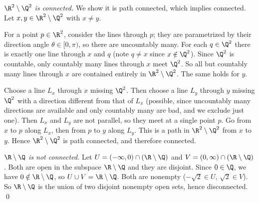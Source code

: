 
\emph{$\R^2\setminus\Q^2$ is connected.} We show it is path connected, which implies connected.
Let $x,y\in\R^2\setminus\Q^2$ with $x\neq y$.

For a point $p\in\R^2$, consider the lines through $p$; they are parametrized by their
direction angle $\theta\in[0,\pi)$, so there are uncountably many. For each $q\in\Q^2$ there is
exactly one line through $x$ and $q$ (note $q\neq x$ since $x\notin\Q^2$). Since $\Q^2$ is
countable, only countably many lines through $x$ meet $\Q^2$. So all but countably many lines
through $x$ are contained entirely in $\R^2\setminus\Q^2$. The same holds for $y$.

Choose a line $L_x$ through $x$ missing $\Q^2$. Then choose a line $L_y$ through $y$ missing
$\Q^2$ with a direction different from that of $L_x$ (possible, since uncountably many
directions are available and only countably many are bad, and we exclude just one). Then $L_x$
and $L_y$ are not parallel, so they meet at a single point $p$. Go from $x$ to $p$ along $L_x$,
then from $p$ to $y$ along $L_y$. This is a path in $\R^2\setminus\Q^2$ from $x$ to $y$. Hence
$\R^2\setminus\Q^2$ is path connected, and therefore connected.

\emph{$\R\setminus\Q$ is not connected.} Let $U=(-\infty,0)\cap(\R\setminus\Q)$ and
$V=(0,\infty)\cap(\R\setminus\Q)$. Both are open in the subspace $\R\setminus\Q$ and they are
disjoint. Since $0\in\Q$, we have $0\notin\R\setminus\Q$, so $U\cup V=\R\setminus\Q$. Both are
nonempty ($-\sqrt2\in U$, $\sqrt2\in V$). So $\R\setminus\Q$ is the union of two disjoint
nonempty open sets, hence disconnected. \qed
